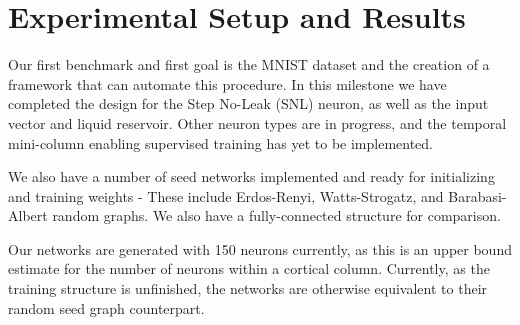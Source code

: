 \section{Experimental Setup and Results} \label{sec:ExperimentalSetup}

Our first benchmark and first goal is the MNIST dataset \cite{MNIST Dataset} and
the creation of a framework that can automate this procedure. In this milestone
we have completed the design for the Step No-Leak (SNL) neuron, as well as the
input vector and liquid reservoir. Other neuron types are in progress, and the
temporal mini-column enabling supervised training has yet to be implemented.

We also have a number of seed networks implemented and ready for initializing
and training weights - These include Erdos-Renyi, Watts-Strogatz, and
Barabasi-Albert random graphs. We also have a fully-connected structure for
comparison.

Our networks are generated with 150 neurons currently, as this is an upper bound
estimate for the number of neurons within a cortical column. Currently, as the
training structure is unfinished, the networks are otherwise equivalent to their
random seed graph counterpart.